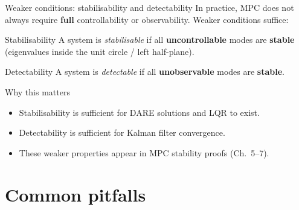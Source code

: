 \documentclass[aspectratio=169,10pt]{beamer}
\begin{document}
\begin{frame}{Weaker conditions: stabilisability and detectability}
In practice, MPC does not always require \textbf{full} controllability or
observability.  Weaker conditions suffice:

\begin{defnbox}{Stabilisability}
A system is \emph{stabilisable} if all \textbf{uncontrollable} modes are
\textbf{stable} (eigenvalues inside the unit circle / left half-plane).
\end{defnbox}

\begin{defnbox}{Detectability}
A system is \emph{detectable} if all \textbf{unobservable} modes are
\textbf{stable}.
\end{defnbox}

\begin{notebox}{Why this matters}
\begin{itemize}
  \item Stabilisability is sufficient for DARE solutions and LQR to exist.
  \item Detectability is sufficient for Kalman filter convergence.
  \item These weaker properties appear in MPC stability proofs (Ch.\ 5--7).
\end{itemize}
\end{notebox}
\end{frame}

\section{Common pitfalls}
\end{document}
